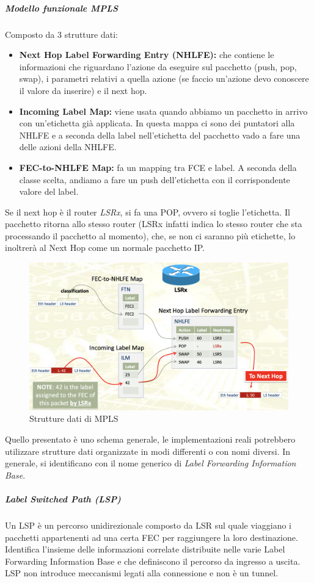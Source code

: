 \documentclass{article}
\begin{document}
\subparagraph{Modello funzionale MPLS}
Composto da 3 strutture dati:
\begin{itemize}
    \item \textbf{Next Hop Label Forwarding Entry (NHLFE):} che contiene le informazioni che riguardano l'azione da eseguire sul pacchetto (push, pop, swap), i parametri relativi a quella azione (se faccio un'azione devo conoscere il valore da inserire) e il next hop.
    \item \textbf{Incoming Label Map:} viene usata quando abbiamo un pacchetto in arrivo con un'etichetta già applicata. In questa mappa ci sono dei puntatori alla NHLFE e a seconda della label nell'etichetta del pacchetto vado a fare una delle azioni della NHLFE.
    \item \textbf{FEC-to-NHLFE Map:} fa un mapping tra FCE e label. A seconda della classe scelta, andiamo a fare un push dell'etichetta con il corrispondente valore del label.
\end{itemize}
Se il next hop è il router \textit{LSRx}, si fa una POP, ovvero si toglie l'etichetta. Il pacchetto ritorna allo stesso router (LSRx infatti indica lo stesso router che sta processando il pacchetto al momento), che, se non ci saranno più etichette, lo inoltrerà al Next Hop come un normale pacchetto IP.
\begin{figure}[H]
    \centering
    \includegraphics[scale=0.4]{figures/mpls strutture dati.png}
    \caption{Strutture dati di MPLS}
\end{figure}
\noindent Quello presentato è uno schema generale, le implementazioni reali potrebbero utilizzare strutture dati organizzate in modi differenti o con nomi diversi. In generale, si identificano con il nome generico di \textit{Label Forwarding Information Base}.
\subparagraph{Label Switched Path (LSP)} Un LSP è un percorso unidirezionale composto da LSR sul quale viaggiano i pacchetti appartenenti ad una certa FEC per raggiungere la loro destinazione. Identifica l'insieme delle informazioni correlate distribuite nelle varie Label Forwarding Information Base e che definiscono il percorso da ingresso a uscita. LSP non introduce meccanismi legati alla connessione e non è un tunnel.
\end{document}
